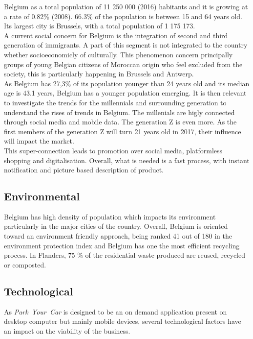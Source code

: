 \documentclass[12pt,a4paper,oneside]{book}
\newcommand{\bp}{\textit{Park~Your~Car }}
\begin{document}
Belgium as a total population of 11 250 000 (2016) habitants and it is growing at a rate of 0.82\% (2008). 66.3\% of the population is between 15 and 64 years old. Its largest city is Brussels, with a total population of 1 175 173\cite{ciafb}.\\

A current social concern for Belgium is the integration of second and third generation of immigrants. A part of this segment is not integrated to the country whether socioeconomicly of culturally. This phenomenon concern principally groups of young Belgian citizens of Moroccan origin who feel excluded from the society, this is particularly happening in Brussels and Antwerp\cite{sgikc}.\\

As Belgium has 27,3\% of its population younger than 24 years old and its median age is 43.1 years, Belgium has a younger population emerging\cite{ciafb}. It is then relevant to investigate the trends for the millennials and surrounding generation to understand the rises of trends in Belgium. The millenials are higly connected through social media and mobile data. The generation Z is even more. As the first members of the generation Z will turn 21 years old in 2017, their influence will impact the market.\\
This super-connection leads to promotion over social media, platformless shopping and digitalisation. Overall, what is needed is a fast process, with instant notification and picture based description of product\cite{stbe}.



\subsection{Environmental}

Belgium has high density of population which impacts its environment particularly in the major cities of the country. Overall, Belgium is oriented toward an environment friendly approach, being ranked 41 out of 180 in the environment protection index\cite{epi} and Belgium has one the most efficient recycling process. In Flanders, 75 \% of the residential waste produced are reused, recycled or composted\cite{wastemana}.

\subsection{Technological}
As \bp is designed to be an on demand application present on desktop computer but mainly mobile devices, several technological factors have an impact on the viability of the business.\\
\end{document}
